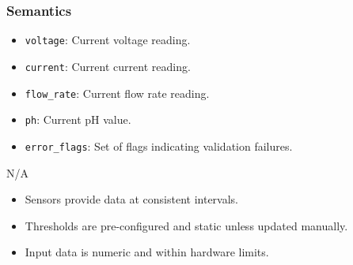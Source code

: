 \documentclass[12pt, titlepage]{article}
\begin{document}
\subsubsection{Semantics}
\begin{description}

  \item[State Variables:]
  \item
    \begin{itemize}
      \item \texttt{voltage}: Current voltage reading.
    \end{itemize}
    \item
    \begin{itemize}
      \item \texttt{current}: Current current reading.
    \end{itemize}
    \item 
    \begin{itemize}
      \item \texttt{flow\_rate}: Current flow rate reading.
    \end{itemize}
    \item 
    \begin{itemize}
      \item \texttt{ph}: Current pH value.
    \end{itemize}
    \item 
    \begin{itemize}
      \item \texttt{error\_flags}: Set of flags indicating validation failures.
    \end{itemize}
  
  \item[Environment Variables:] N/A

  \item[Assumptions:]
  \item
    \begin{itemize}
      \item Sensors provide data at consistent intervals.
    \end{itemize}
    \item
    \begin{itemize}
      \item Thresholds are pre-configured and static unless updated manually.
    \end{itemize}
    \item 
    \begin{itemize}
      \item Input data is numeric and within hardware limits.
    \end{itemize}


\end{description}
\end{document}
